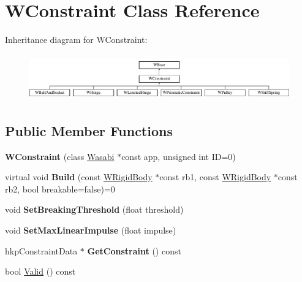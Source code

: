\hypertarget{class_w_constraint}{}\section{W\+Constraint Class Reference}
\label{class_w_constraint}
Inheritance diagram for W\+Constraint\+:\begin{figure}[H]
\begin{center}
\leavevmode
\includegraphics[height=2.014389cm]{class_w_constraint}
\end{center}
\end{figure}
\subsection*{Public Member Functions}
\begin{DoxyCompactItemize}
\item 
{\bfseries W\+Constraint} (class \hyperlink{class_wasabi}{Wasabi} $\ast$const app, unsigned int ID=0)\hypertarget{class_w_constraint_a21b990edbd3f3dc64e922ffb821e7d14}{}\label{class_w_constraint_a21b990edbd3f3dc64e922ffb821e7d14}

\item 
virtual void {\bfseries Build} (const \hyperlink{class_w_rigid_body}{W\+Rigid\+Body} $\ast$const rb1, const \hyperlink{class_w_rigid_body}{W\+Rigid\+Body} $\ast$const rb2, bool breakable=false)=0\hypertarget{class_w_constraint_a9bb986fc73ef934d3d79055b1f124047}{}\label{class_w_constraint_a9bb986fc73ef934d3d79055b1f124047}

\item 
void {\bfseries Set\+Breaking\+Threshold} (float threshold)\hypertarget{class_w_constraint_a8faa2422e6e1b740c8f8aa3cd44d00b0}{}\label{class_w_constraint_a8faa2422e6e1b740c8f8aa3cd44d00b0}

\item 
void {\bfseries Set\+Max\+Linear\+Impulse} (float impulse)\hypertarget{class_w_constraint_a5e5b025ad26fe59ebe3fba98712f120e}{}\label{class_w_constraint_a5e5b025ad26fe59ebe3fba98712f120e}

\item 
hkp\+Constraint\+Data $\ast$ {\bfseries Get\+Constraint} () const \hypertarget{class_w_constraint_ab1d212004a66467136f3358430b612eb}{}\label{class_w_constraint_ab1d212004a66467136f3358430b612eb}

\item 
bool \hyperlink{class_w_constraint_aea99eb105fd8eca22f40bc67b5214590}{Valid} () const 
\end{DoxyCompactItemize}
